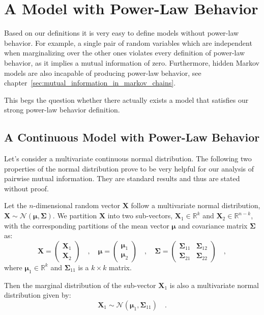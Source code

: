 \documentclass[../../main.tex]{subfiles}
\begin{document}
\section{A Model with Power-Law Behavior}
Based on our definitions it is very easy to define models without power-law behavior. For example, a single pair of random variables which are independent when marginalizing over the other ones violates every definition of power-law behavior, as it implies a mutual information of zero. Furthermore, hidden Markov models are also incapable of producing power-law behavior, see chapter~\ref{sec:mutual_information_in_markov_chains}.

This begs the question whether there actually exists a model that satisfies our strong power-law behavior definition.

\subsection{A Continuous Model with Power-Law Behavior}
Let's consider a multivariate continuous normal distribution. The following two properties of the normal distribution prove to be very helpful for our analysis of pairwise mutual information. They are standard results and thus are stated without proof.

\begin{proposition}
    \label{proposition:marginal_distributions_of_a_normal_distribution}
    Let the $n$-dimensional random vector $\bm{X}$ follow a multivariate normal distribution, $\bm{X} \sim \mathcal{N}(\bm{\mu}, \bm{\Sigma})$. We partition $\bm{X}$ into two sub-vectors, $\bm{X}_1 \in \mathbb{R}^k$ and $\bm{X}_2 \in \mathbb{R}^{n-k}$, with the corresponding partitions of the mean vector $\bm{\mu}$ and covariance matrix $\bm{\Sigma}$ as:
    \[
        \bm{X} = \begin{pmatrix} \bm{X}_1 \\ \bm{X}_2 \end{pmatrix} \quad , \quad 
        \bm{\mu} = \begin{pmatrix} \bm{\mu}_1 \\ \bm{\mu}_2 \end{pmatrix} \quad , \quad 
        \bm{\Sigma} = \begin{pmatrix} \bm{\Sigma}_{11} & \bm{\Sigma}_{12} \\ \bm{\Sigma}_{21} & \bm{\Sigma}_{22} \end{pmatrix} \quad ,
    \]
    where $\bm{\mu}_1 \in \mathbb{R}^k$ and $\bm{\Sigma}_{11}$ is a $k \times k$ matrix.
    
    Then the marginal distribution of the sub-vector $\bm{X}_1$ is also a multivariate normal distribution given by:
    \[
        \bm{X}_1 \sim \mathcal{N}(\bm{\mu}_1, \bm{\Sigma}_{11}) \quad .
    \]
\end{proposition}
\end{document}
